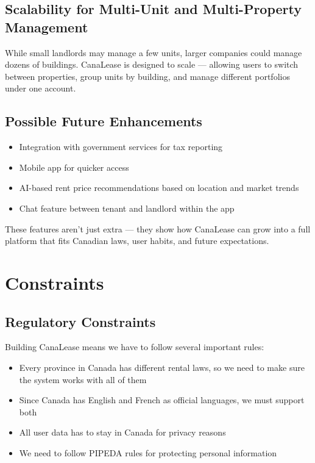 \documentclass[12pt]{article}
\begin{document}
\subsection{Scalability for Multi-Unit and Multi-Property Management}
While small landlords may manage a few units, larger companies could manage dozens of buildings. CanaLease is designed to scale — allowing users to switch between properties, group units by building, and manage different portfolios under one account.

\subsection{Possible Future Enhancements}
\begin{itemize}
    \item Integration with government services for tax reporting
    \item Mobile app for quicker access
    \item AI-based rent price recommendations based on location and market trends
    \item Chat feature between tenant and landlord within the app
\end{itemize}

These features aren't just extra — they show how CanaLease can grow into a full platform that fits Canadian laws, user habits, and future expectations.

\section{Constraints}

\subsection{Regulatory Constraints}
Building CanaLease means we have to follow several important rules:
\begin{itemize}
    \item Every province in Canada has different rental laws, so we need to make sure the system works with all of them
    \item Since Canada has English and French as official languages, we must support both
    \item All user data has to stay in Canada for privacy reasons
    \item We need to follow PIPEDA rules for protecting personal information
\end{itemize}
\end{document}
